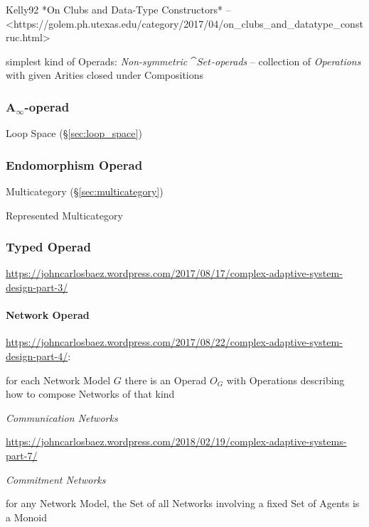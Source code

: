 Kelly92 *On Clubs and Data-Type Constructors* --
<https://golem.ph.utexas.edu/category/2017/04/on_clubs_and_datatype_construc.html>

simplest kind of Operads: \emph{Non-symmetric $\cat{Set}$-operads} --
collection of \emph{Operations} with given Arities closed under
Compositions



\subsubsection{A$_\infty$-operad}\label{sec:a_infinity_operad}

Loop Space (\S\ref{sec:loop_space})



\subsubsection{Endomorphism Operad}\label{sec:endomorphism_operad}

Multicategory (\S\ref{sec:multicategory})

Represented Multicategory



\subsubsection{Typed Operad}\label{sec:typed_operad}

\url{https://johncarlosbaez.wordpress.com/2017/08/17/complex-adaptive-system-design-part-3/}



\paragraph{Network Operad}\label{sec:network_operad}\hfill

\url{https://johncarlosbaez.wordpress.com/2017/08/22/complex-adaptive-system-design-part-4/}:

for each Network Model $G$ there is an Operad $O_G$ with Operations describing
how to compose Networks of that kind

\emph{Communication Networks}

\url{https://johncarlosbaez.wordpress.com/2018/02/19/complex-adaptive-systems-part-7/}

\emph{Commitment Networks}

for any Network Model, the Set of all Networks involving a fixed Set of Agents
is a Monoid

